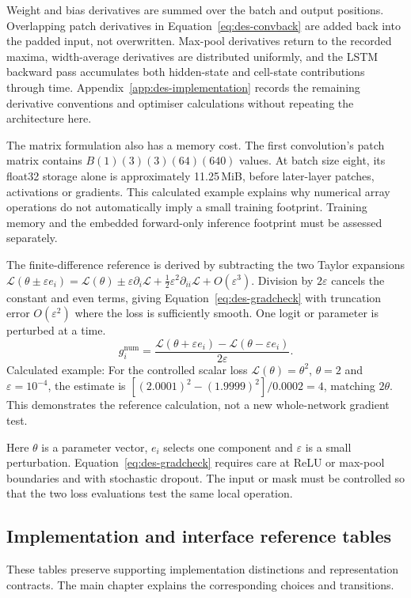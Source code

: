 Weight and bias derivatives are summed over the batch and output positions. Overlapping patch derivatives in Equation~\ref{eq:des-convback} are added back into the padded input, not overwritten. Max-pool derivatives return to the recorded maxima, width-average derivatives are distributed uniformly, and the LSTM backward pass accumulates both hidden-state and cell-state contributions through time. Appendix~\ref{app:des-implementation} records the remaining derivative conventions and optimiser calculations without repeating the architecture here.

The matrix formulation also has a memory cost. The first convolution's patch matrix contains $B(1)(3)(3)(64)(640)$ values. At batch size eight, its float32 storage alone is approximately 11.25\,MiB, before later-layer patches, activations or gradients. This calculated example explains why numerical array operations do not automatically imply a small training footprint. Training memory and the embedded forward-only inference footprint must be assessed separately.


The finite-difference reference is derived by subtracting the two Taylor expansions $\mathcal L(\theta\pm\varepsilon e_i)=\mathcal L(\theta)\pm\varepsilon\partial_i\mathcal L+\tfrac12\varepsilon^2\partial_{ii}\mathcal L+O(\varepsilon^3)$. Division by $2\varepsilon$ cancels the constant and even terms, giving Equation~\ref{eq:des-gradcheck} with truncation error $O(\varepsilon^2)$ where the loss is sufficiently smooth. One logit or parameter is perturbed at a time.
\begin{equation}
g_i^{\mathrm{num}}=\frac{\mathcal L(\theta+\varepsilon e_i)
-\mathcal L(\theta-\varepsilon e_i)}{2\varepsilon}.
\label{eq:des-gradcheck}
\end{equation}
Calculated example: For the controlled scalar loss $\mathcal L(\theta)=\theta^2$, $\theta=2$ and $\varepsilon=10^{-4}$, the estimate is $[(2.0001)^2-(1.9999)^2]/0.0002=4$, matching $2\theta$. This demonstrates the reference calculation, not a new whole-network gradient test.

Here $\theta$ is a parameter vector, $e_i$ selects one component and $\varepsilon$ is a small perturbation. Equation~\ref{eq:des-gradcheck} requires care at ReLU or max-pool boundaries and with stochastic dropout. The input or mask must be controlled so that the two loss evaluations test the same local operation.


\subsection{Implementation and interface reference tables}\label{app:des-reference-tables}
These tables preserve supporting implementation distinctions and representation contracts. The main chapter explains the corresponding choices and transitions.

